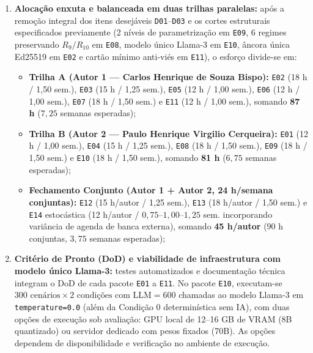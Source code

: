 \documentclass[12pt,openany,oneside,a4paper,english,brazilian,sumario=tradicional]{abntex2}
\begin{document}
\begin{enumerate}
  \item \textbf{Alocação enxuta e balanceada em duas trilhas paralelas:} após a remoção integral dos itens desejáveis \texttt{D01}--\texttt{D03} e os cortes estruturais especificados previamente (2 níveis de parametrização em \texttt{E09}, 6 regimes preservando $R_9/R_{10}$ em \texttt{E08}, modelo único Llama-3 em \texttt{E10}, âncora única Ed25519 em \texttt{E02} e cartão mínimo anti-viés em \texttt{E11}), o esforço divide-se em:
  \begin{itemize}
    \item \textbf{Trilha A (Autor 1 --- Carlos Henrique de Souza Bispo):} \texttt{E02} (18 h / 1,50 sem.), \texttt{E03} (15 h / 1,25 sem.), \texttt{E05} (12 h / 1,00 sem.), \texttt{E06} (12 h / 1,00 sem.), \texttt{E07} (18 h / 1,50 sem.) e \texttt{E11} (12 h / 1,00 sem.), somando \textbf{87 h} ($7{,}25$ semanas esperadas);
    \item \textbf{Trilha B (Autor 2 --- Paulo Henrique Virgilio Cerqueira):} \texttt{E01} (12 h / 1,00 sem.), \texttt{E04} (15 h / 1,25 sem.), \texttt{E08} (18 h / 1,50 sem.), \texttt{E09} (18 h / 1,50 sem.) e \texttt{E10} (18 h / 1,50 sem.), somando \textbf{81 h} ($6{,}75$ semanas esperadas);
    \item \textbf{Fechamento Conjunto (Autor 1 + Autor 2, 24 h/semana conjuntas):} \texttt{E12} (15 h/autor / 1,25 sem.), \texttt{E13} (18 h/autor / 1,50 sem.) e \texttt{E14} estocástica (12 h/autor / $0{,}75$--$1{,}00$--$1{,}25$ sem. incorporando variância de agenda de banca externa), somando \textbf{45 h/autor} ($90$ h conjuntas, $3{,}75$ semanas esperadas);
  \end{itemize}
  \item \textbf{Critério de Pronto (DoD) e viabilidade de infraestrutura com modelo único Llama-3:} testes automatizados e documentação técnica integram o DoD de cada pacote \texttt{E01} a \texttt{E11}. No pacote \texttt{E10}, executam-se $300\text{ cenários} \times 2\text{ condições com LLM} = 600$ chamadas ao modelo Llama-3 em \texttt{temperature=0.0} (além da Condição 0 determinística sem IA), com duas opções de execução sob avaliação: GPU local de 12--16 GB de VRAM (8B quantizado) ou servidor dedicado com pesos fixados (70B). As opções dependem de disponibilidade e verificação no ambiente de execução.
\end{enumerate}
\end{document}
